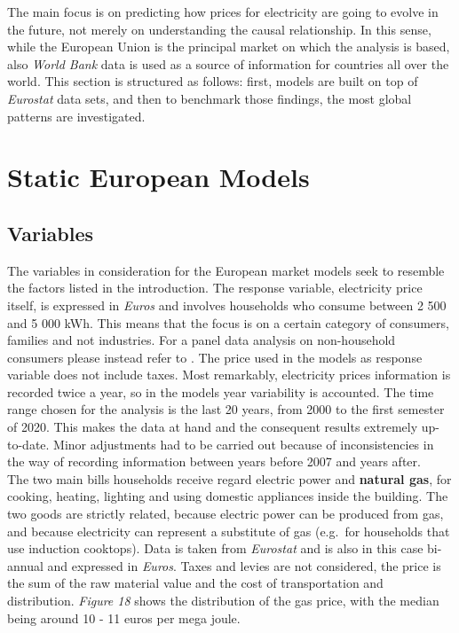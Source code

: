 \documentclass{book}
\begin{document}
\noindent The main focus is on predicting how prices for electricity are going to evolve in the future, not merely on understanding the causal relationship. In this sense, while the European Union is the principal market on which the analysis is based, also \textit{World Bank} data is used as a source of information for countries all over the world. This section is structured as follows: first, models are built on top of \textit{Eurostat} data sets, and then to benchmark those findings, the most global patterns are investigated.

\section{Static European Models}
\subsection*{Variables}

The variables in consideration for the European market models seek to resemble the factors listed in the introduction. The response variable, electricity price itself, is expressed in \textit{Euros} and involves households who consume between 2 500 and 5 000 kWh. This means that the focus is on a certain category of consumers, families and not industries. For a panel data analysis on non-household consumers please instead refer to \cite{del2019industrial}.  The price used in the models as response variable does not include taxes. Most remarkably, electricity prices information is recorded twice a year, so in the models year variability is accounted. The time range chosen for the analysis is the last 20 years, from 2000 to the first semester of 2020. This makes the data at hand and the consequent results extremely up-to-date. Minor adjustments had to be carried out because of inconsistencies in the way of recording information between years before 2007 and years after.\\

\noindent The two main bills households receive regard electric power and \textbf{natural gas}, for cooking, heating, lighting and using domestic appliances inside the building. The two goods are strictly related, because electric power can be produced from gas, and because electricity can represent a substitute of gas (e.g.\ for households that use induction cooktops). Data is taken from \textit{Eurostat} and is also in this case bi-annual and expressed in \textit{Euros}. Taxes and levies are not considered, the price is the sum of the raw material value and the cost of transportation and distribution. \textit{Figure 18} shows the distribution of the gas price, with the median being around 10 - 11 euros per mega joule.
\end{document}
